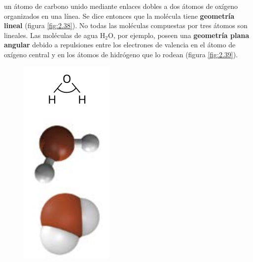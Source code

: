 \documentclass[12pt]{guia}
\begin{document}
\begin{opening}
{\begin{minipage}{.55\textwidth}
            un átomo de carbono unido mediante enlaces dobles a dos átomos de oxígeno organizados en una línea. Se dice entonces que la molécula tiene \textbf{geometría lineal} (figura \ref{fig:2.38}).
            No todas las moléculas compuestas por tres átomos son lineales. Las moléculas
            de agua H$_2$O, por ejemplo, poseen una \textbf{geometría plana angular} debido a repulsiones
            entre los electrones de valencia en el átomo de oxígeno central y en los átomos de
            hidrógeno que lo rodean (figura \ref{fig:2.39}).
        \end{minipage}\hfill
        \begin{minipage}{.2\textwidth}
            \begin{figure}[H]
                \centering
                \includegraphics[width=.9\linewidth]{../images/fig2.39.png}

\end{figure}
\end{minipage}}
\end{opening}
\end{document}
